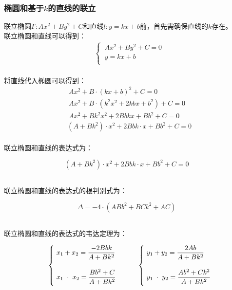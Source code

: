 \documentclass[UTF8]{ctexart}
\begin{document}
\subsubsection{椭圆和基于$k$的直线的联立}
    \setcounter{equation}{0}
    联立椭圆$\Gamma:Ax^2+By^2+C$和直线$l:y=kx+b$前，首先需确保直线的$k$存在。\\[3mm]
    联立椭圆和直线可以得到：
    \begin{align}
        &\begin{cases}
            ~Ax^2+By^2+C=0\\[1mm]
            ~y=kx+b\\[1mm]
        \end{cases}
    \end{align}\\[1mm]
    将直线代入椭圆可以得到：
    \begin{align}
        &~Ax^2+B\cdot(kx+b)^2+C=0\\[5mm]
        &~Ax^2+B\cdot\left(k^2x^2+2kbx+b^2\right)+C=0\\[5mm]
        &~Ax^2+Bk^2x^2+2Bbkx+Bb^2+C=0\\[5mm]
        &\left(A+Bk^2\right)\cdot x^2+2Bbk\cdot x+Bb^2+C=0
    \end{align}\\
    联立椭圆和直线的表达式为：
    \begin{large}
        \begin{equation*}
            \left(A+Bk^2\right)\cdot x^2+2Bbk\cdot x+Bb^2+C=0
        \end{equation*}
    \end{large}\\
    联立椭圆和直线的表达式的根判别式为：
    \begin{large}
        \begin{equation*}
            \Delta=-4\cdot\left(ABb^2+BCk^2+AC\right)
        \end{equation*}
    \end{large}\\
    联立椭圆和直线的表达式的韦达定理为：\vspace{8pt}
    \begin{large}
        \begin{equation*}
            ~~~~~~\begin{cases}
                ~x_1+x_2=\dfrac{-2Bbk}{A+Bk^2}\\[6mm]
                ~x_1\hspace{3.0pt}\cdot\hspace{3.0pt}x_2=\dfrac{Bb^2+C}{A+Bk^2}\\[2mm]
            \end{cases}~~~~~~
            \begin{cases}
                ~y_1+y_2=\dfrac{2Ab}{A+Bk^2}\\[6mm]
                ~y_1\hspace{3.0pt}\cdot\hspace{3.0pt}y_2=\dfrac{Ab^2+Ck^2}{A+Bk^2}\\[2mm]
            \end{cases}
        \end{equation*}
    \end{large}\\[3mm]
\end{document}
